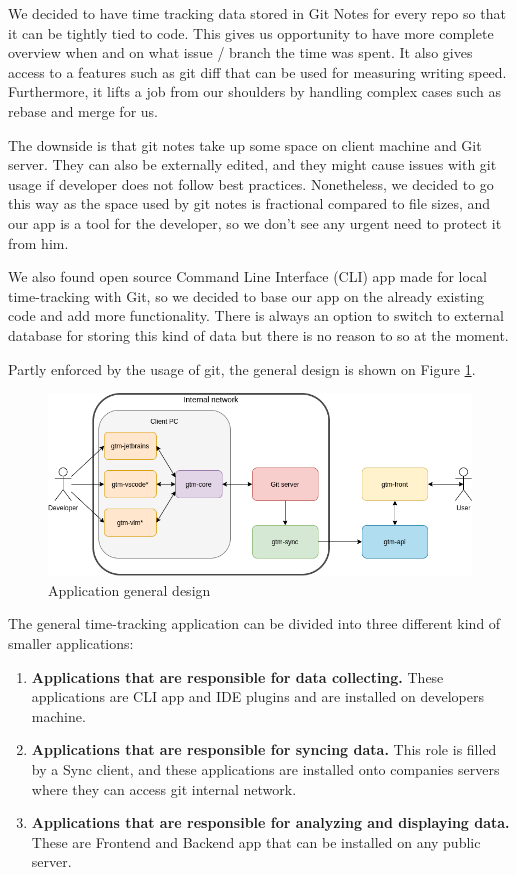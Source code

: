 
We decided to have time tracking data stored in Git Notes for every repo so that it can be tightly tied to code.
This gives us opportunity to have more complete overview when and on what issue / branch the time was spent.
It also gives access to a features such as git diff that can be used for measuring writing speed.
Furthermore, it lifts a job from our shoulders by handling complex cases such as rebase and merge for us.

The downside is that git notes take up some space on client machine and Git server.
They can also be externally edited, and they might cause issues with git usage if developer does not follow best practices.
Nonetheless, we decided to go this way as the space used by git notes is fractional compared to file sizes, and our app is a tool for the developer,
so we don't see any urgent need to protect it from him.

We also found open source Command Line Interface (CLI) app made for local time-tracking with Git, so we decided to base our app on the already existing code and add more functionality.
There is always an option to switch to external database for storing this kind of data but there is no reason to so at the moment.

Partly enforced by the usage of git, the general design is shown on Figure
\ref{fig:project-archidecture}.

\begin{figure}[h]
    \includegraphics[width=\textwidth]{figures/project_archidecture}
    \caption{Application general design}
    \label{fig:project-archidecture}
\end{figure}

The general time-tracking application can be divided into three different kind of smaller applications:
\begin{enumerate}
    \item \textbf{Applications that are responsible for data collecting.} These applications are CLI app and IDE plugins and are installed on developers machine.
    \item \textbf{Applications that are responsible for syncing data.} This role is filled by a Sync client, and these applications are installed onto companies servers where they can access git internal network.
    \item \textbf{Applications that are responsible for analyzing and displaying data.} These are Frontend and Backend app that can be installed on any public server.
\end{enumerate}

